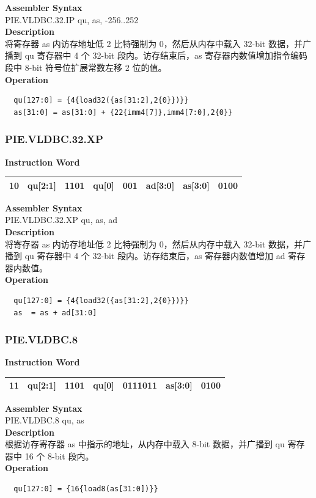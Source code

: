 \textbf{Assembler Syntax} \\
PIE.VLDBC.32.IP qu, as, -256..252 \\
\textbf{Description} \\
将寄存器 as 内访存地址低 2 比特强制为 0，然后从内存中载入 32-bit 数据，并广播到 qu 寄存器中 4 个 32-bit 段内。访存结束后，as 寄存器内数值增加指令编码段中 8-bit 符号位扩展常数左移 2 位的值。\\
\textbf{Operation}
\begin{lstlisting}
  qu[127:0] = {4{load32({as[31:2],2{0}})}}
  as[31:0] = as[31:0] + {22{imm4[7]},imm4[7:0],2{0}}
\end{lstlisting}

\newpage
\subsubsection{PIE.VLDBC.32.XP}\label{instruction:PIEVLDBC32XP}
\setlength\tabcolsep{6pt}
\textbf{Instruction Word} \\
\begin{tabular}{|c|c|c|c|c|c|c|c|}
	\hline
	10 & qu[2:1] & 1101 & qu[0] & 001 & ad[3:0] & as[3:0] & 0100 \\
	\hline
\end{tabular}

\textbf{Assembler Syntax} \\
PIE.VLDBC.32.XP qu, as, ad \\
\textbf{Description} \\
将寄存器 as 内访存地址低 2 比特强制为 0，然后从内存中载入 32-bit 数据，并广播到 qu 寄存器中 4 个 32-bit 段内。访存结束后，as 寄存器内数值增加 ad 寄存器内数值。\\
\textbf{Operation}
\begin{lstlisting}
  qu[127:0] = {4{load32({as[31:2],2{0}})}}
  as  = as + ad[31:0]
\end{lstlisting}

\newpage
\subsubsection{PIE.VLDBC.8}\label{instruction:PIEVLDBC8}
\setlength\tabcolsep{6pt}
\textbf{Instruction Word} \\
\begin{tabular}{|c|c|c|c|c|c|c|}
	\hline
	11 & qu[2:1] & 1101 & qu[0] & 0111011 & as[3:0] & 0100 \\
	\hline
\end{tabular}

\textbf{Assembler Syntax} \\
PIE.VLDBC.8 qu, as \\
\textbf{Description} \\
根据访存寄存器 as 中指示的地址，从内存中载入 8-bit 数据，并广播到 qu 寄存器中 16 个 8-bit 段内。\\
\textbf{Operation}
\begin{lstlisting}
  qu[127:0] = {16{load8(as[31:0])}}
\end{lstlisting}

